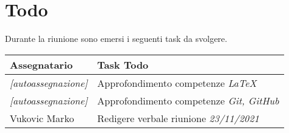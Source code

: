 \section{Todo}
Durante la riunione sono emersi i seguenti task da svolgere.

\begin{center}
  \begin{tabular}{|p{5cm}|p{8cm}|}
    \hline
    \textbf{Assegnatario}       & \textbf{Task Todo}                             \\ \hline
    \textit{[autoassegnazione]} & Approfondimento competenze \textit{LaTeX}       \\ \hline
    \textit{[autoassegnazione]} & Approfondimento competenze \textit{Git, GitHub} \\ \hline
    Vukovic Marko               & Redigere verbale riunione \textit{23/11/2021}  \\ \hline
  \end{tabular}
\end{center}
